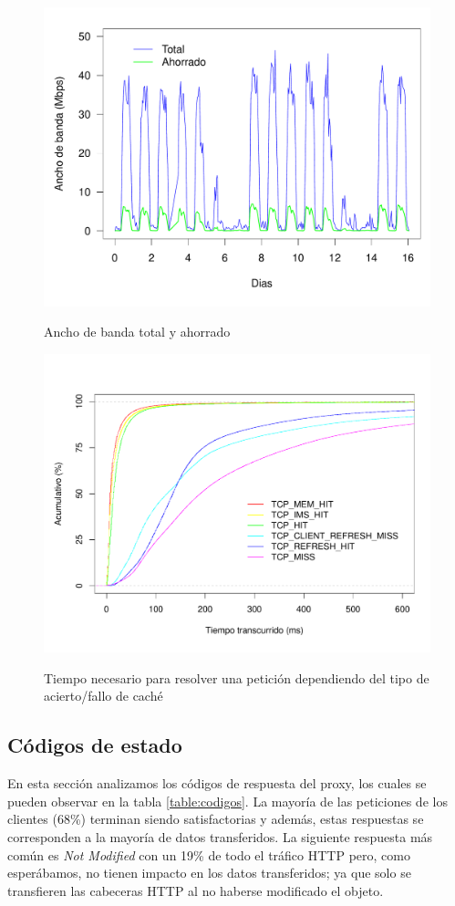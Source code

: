 \documentclass[twocolumn]{Jornadas}
\begin{document}
\begin{figure}[ht!]
\includegraphics[scale=0.30]{figures/Bandwidth_full.pdf}\label{fig:ahorrado}
\caption{Ancho de banda total y ahorrado}
\label{fig:ahorrado}
\end{figure}

\begin{figure}[ht!]
\includegraphics[scale=0.30]{figures/ElapsedTimeAll_1k_full.pdf} \label{fig:elapsed}
\caption{Tiempo necesario para resolver una petición dependiendo del tipo de acierto/fallo de caché}
\label{fig:elapsed}
\end{figure}

\subsection{Códigos de estado}
En esta sección analizamos los códigos de respuesta del proxy, los cuales se pueden observar en la tabla \ref{table:codigos}. La mayoría de las peticiones de los clientes (68\%) terminan siendo satisfactorias y además, estas respuestas se corresponden a la mayoría de datos transferidos. La siguiente respuesta más común es \textit{Not Modified} con un 19\% de todo el tráfico HTTP pero, como esperábamos, no tienen impacto en los datos transferidos; ya que solo se transfieren las cabeceras HTTP al no haberse modificado el objeto.
\end{document}
